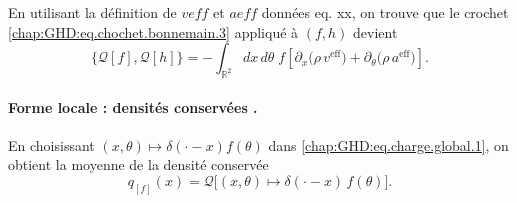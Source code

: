 
\medskip 

En utilisant la définition de $veff$ et $aeff$ données eq. xx, on trouve que le crochet \eqref{chap:GHD:eq.chochet.bonnemain.3} appliqué à $(f,h)$ devient 
\begin{equation}\label{chap:GHD:eq.chochet.bonnemain.4}
	\{\mathcal{Q}[f], \mathcal{Q}[h]\} 
	= - \int_{\mathbb{R}^2} dx\, d\theta \; f \left[ \partial_x \big( \rho \, v^{\mathrm{eff}} \big) 
	+ \partial_\theta \big( \rho \, a^{\mathrm{eff}} \big) \right].
\end{equation}

\paragraph{Forme locale : densités conservées .} 
En choisissant $(x,\theta) \mapsto \delta(\cdot - x)f(\theta)$ dans \eqref{chap:GHD:eq.charge.global.1}, on obtient la moyenne de la densité conservée \ie
\begin{equation}
	q_{[f]}(x) = \mathcal{Q} \big[ (x,\theta) \mapsto \delta(\cdot - x) \, f(\theta) \big].
\end{equation}

